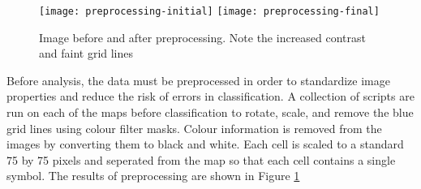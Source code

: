 
\begin{figure}[h]
    \begin{center}
    \texttt{[image: preprocessing-initial]}
    \texttt{[image: preprocessing-final]}
    \label{figure:preprocess}
    \caption{Image before and after preprocessing. Note the increased contrast and faint grid lines}
    \end{center}
\end{figure}

Before analysis, the data must be preprocessed in order to standardize image
properties and reduce the risk of errors in classification. A collection of
scripts are run on each of the maps before classification to rotate, scale,
and remove the blue grid lines using colour filter masks.  Colour information is
removed from the images by converting them to black and white. Each cell is
scaled to a standard 75 by 75 pixels and seperated from the map so that each
cell contains a single symbol.  The results of preprocessing are shown in
Figure \ref{figure:preprocess}

